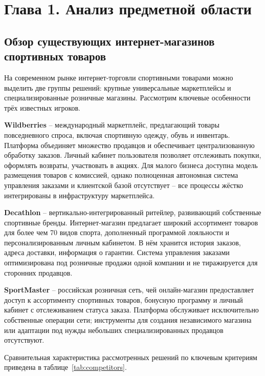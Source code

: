 \section*{Глава 1. Анализ предметной области}

\subsection{Обзор существующих интернет-магазинов спортивных товаров}

На современном рынке интернет-торговли спортивными товарами можно выделить две группы решений: крупные универсальные маркетплейсы и специализированные розничные магазины. Рассмотрим ключевые особенности трёх известных игроков.

\textbf{Wildberries} – международный маркетплейс, предлагающий товары повседневного спроса, включая спортивную одежду, обувь и инвентарь. Платформа объединяет множество продавцов и обеспечивает централизованную обработку заказов. Личный кабинет пользователя позволяет отслеживать покупки, оформлять возвраты, участвовать в акциях. Для малого бизнеса доступна модель размещения товаров с комиссией, однако полноценная автономная система управления заказами и клиентской базой отсутствует – все процессы жёстко интегрированы в инфраструктуру маркетплейса.

\textbf{Decathlon} – вертикально-интегрированный ритейлер, развивающий собственные спортивные бренды. Интернет-магазин предлагает широкий ассортимент товаров для более чем 70 видов спорта, дополненный программой лояльности и персонализированным личным кабинетом. В нём хранится история заказов, адреса доставки, информация о гарантии. Система управления заказами оптимизирована под розничные продажи одной компании и не тиражируется для сторонних продавцов.

\textbf{SportMaster} – российская розничная сеть, чей онлайн-магазин предоставляет доступ к ассортименту спортивных товаров, бонусную программу и личный кабинет с отслеживанием статуса заказа. Платформа обслуживает исключительно собственные операции сети; инструменты для создания независимого магазина или адаптации под нужды небольших специализированных продавцов отсутствуют.

Сравнительная характеристика рассмотренных решений по ключевым критериям приведена в таблице~\ref{tab:competitors}.

